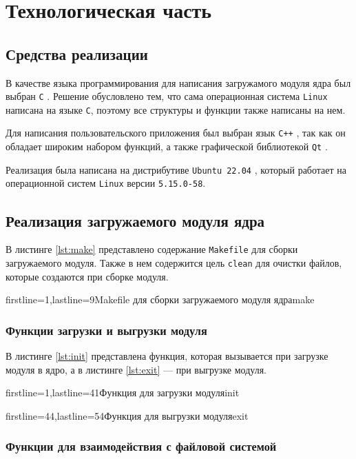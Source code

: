 \chapter{Технологическая часть}

\section{Средства реализации}

В качестве языка программирования для написания загружамого модуля ядра был выбран \texttt{C} \cite{c}. Решение обусловлено тем, что сама операционная система \texttt{Linux} \cite{linux} написана на языке \texttt{C}, поэтому все структуры и функции также написаны на нем.

Для написания пользовательского приложения был выбран язык \texttt{C++} \cite{cpp}, так как он обладает широким набором функций, а также графической библиотекой \texttt{Qt} \cite{qt}.

Реализация была написана на дистрибутиве \texttt{Ubuntu 22.04} \cite{ubuntu}, который работает на операционной систем \texttt{Linux} версии \texttt{5.15.0-58}.


\section{Реализация загружаемого модуля ядра}

В листинге \ref{lst:make} представлено содержание \texttt{Makefile} для сборки загружаемого модуля. Также в нем содержится цель \texttt{clean} для очистки файлов, которые создаются при сборке модуля.

        {firstline=1,lastline=9}{Makefile для сборки загружаемого модуля ядра}{make}{}

\subsection{Функции загрузки и выгрузки модуля}

В листинге \ref{lst:init} представлена функция, которая вызывается при загрузке модуля в ядро, а в листинге \ref{lst:exit} --- при выгрузке модуля.

    {firstline=1,lastline=41}{Функция для загрузки модуля}{init}{}
        
    {firstline=44,lastline=54}{Функция для выгрузки модуля}{exit}{}


\subsection{Функции для взаимодействия с файловой системой}

